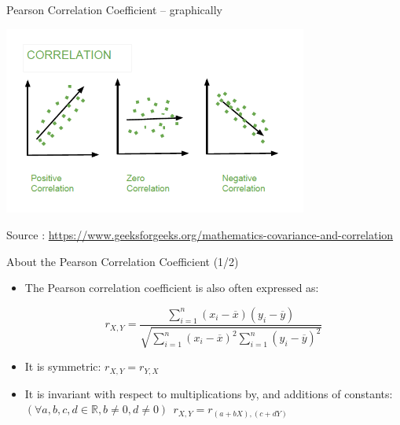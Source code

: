 \documentclass{beamer}
\begin{document}
\begin{frame}
{\centerline{Pearson Correlation Coefficient -- graphically}}


\begin{center}
\includegraphics[width=10cm]{P2023.AIBCCSS.FoundationsDataScience/Correl.png}
\end{center} 
\begin{center}
\tiny 
Source : \url{https://www.geeksforgeeks.org/mathematics-covariance-and-correlation}
\end{center}

\end{frame}


\begin{frame}
{\centerline{About the Pearson Correlation Coefficient (1/2)}}

\begin{itemize}
\item The Pearson correlation coefficient is also often expressed as:

$$ r_{X,Y} = \frac{\sum_{i=1}^{n}(x_i-\overline{x})(y_i-\overline{y})}{\sqrt{\sum_{i=1}^{n}(x_i-\overline{x})^2\sum_{i=1}^{n}(y_i-\overline{y})^2}} $$
\item It is symmetric: $r_{X,Y} = r_{Y,X}$
\item It is invariant with respect to multiplications by, and additions of constants:\\
$(\forall a, b, c, d \in \mathbb{R} , b \neq 0, d \neq 0)~~ r_{X,Y} = r_{(a + bX),(c + dY)} $
\end{itemize}


\end{frame}
\end{document}
